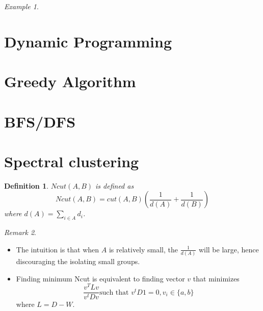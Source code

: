 \documentclass{article}
\newtheorem{definition}{Definition}
\theoremstyle{remark}
\newtheorem{example}{Example}
\newtheorem{remark}[example]{Remark}
\begin{document}
\begin{example}
\begin{itemize}
\end{itemize}
\end{example}

\section{Dynamic Programming}

\section{Greedy Algorithm}

\section{BFS/DFS}



\section*{Spectral clustering}
\begin{definition}
$Ncut(A,B)$ is defined as $$Ncut(A,B) = cut(A,B)(\frac 1{d(A)}+\frac 1{d(B)})$$ where $d(A)=\sum_{i\in A}d_i$.
\end{definition}
\begin{remark}
\begin{itemize}
\item The intuition is that when $A$ is relatively small, the $\frac 1{d(A)}$ will be large, hence discouraging the isolating small groups.
\item Finding minimum Ncut is equivalent to finding vector $v$ that minimizes $$\frac{v^T Lv}{v^tDv}\text{such that }v^tD1=0,v_i\in\{a,b\}$$ where 
$L=D-W$.

\end{itemize}
\end{remark}
\end{document}

